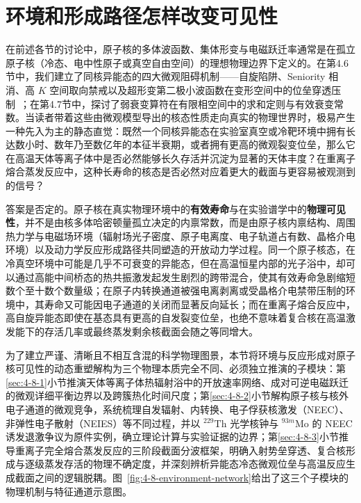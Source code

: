 \section{环境和形成路径怎样改变可见性}\label{sec:4-8}

在前述各节的讨论中，原子核的多体波函数、集体形变与电磁跃迁率通常是在孤立原子核（冷态、电中性原子或真空自由空间）的理想物理边界下定义的。在第4.6节中，我们建立了同核异能态的四大微观阻碍机制——自旋陷阱、Seniority 相消、高 $K$ 空间取向禁戒以及超形变第二极小波函数在变形空间中的位垒穿透压制~\cite{book-jain-nuclear-isomers}；在第4.7节中，探讨了弱衰变算符在有限相空间中的求和定则与有效衰变常数。当读者带着这些由微观模型导出的核态性质走向真实的物理世界时，极易产生一种先入为主的静态直觉：既然一个同核异能态在实验室真空或冷靶环境中拥有长达数小时、数年乃至数亿年的本征半衰期，或者拥有更高的微观裂变位垒，那么它在高温天体等离子体中是否必然能够长久存活并沉淀为显著的天体丰度？在重离子熔合蒸发反应中，这种长寿命的核态是否必然对应着更大的截面与更容易被观测到的信号？

答案是否定的。原子核在真实物理环境中的\textbf{有效寿命}与在实验谱学中的\textbf{物理可见性}，并不是由核多体哈密顿量孤立决定的内禀常数，而是由原子核内禀结构、周围热力学与电磁场环境（辐射场光子密度、原子电离度、电子轨道占有数、晶格介电环境）以及动力学反应形成路径共同塑造的开放动力学过程。同一个原子核态，在冷真空环境中可能是几乎不可衰变的异能态，但在高温恒星内部的光子浴中，却可以通过高能中间桥态的热共振激发起发生剧烈的跨带混合，使其有效寿命急剧缩短数个至十数个数量级；在原子内转换通道被强电离剥离或受晶格介电禁带压制的环境中，其寿命又可能因电子通道的关闭而显著反向延长；而在重离子熔合反应中，高自旋异能态即使在基态具有更高的自发裂变位垒，也绝不意味着复合核在高温激发能下的存活几率或最终蒸发剩余核截面会随之等同增大。

为了建立严谨、清晰且不相互含混的科学物理图景，本节将环境与反应形成对原子核可见性的动态重塑解构为三个物理本质完全不同、必须独立推演的子模块：第\ref{sec:4-8-1}小节推演天体等离子体热辐射浴中的开放速率网络、成对可逆电磁跃迁的微观详细平衡边界以及跨簇热化时间尺度；第\ref{sec:4-8-2}小节解构原子核与核外电子通道的微观竞争，系统梳理自发辐射、内转换、电子俘获核激发（NEEC）、非弹性电子散射（NEIES）等不同过程，并以 $^{229}\mathrm{Th}$ 光学核钟与 $^{93m}\mathrm{Mo}$ 的 NEEC 诱发退激争议为原件实例，确立理论计算与实验证据的边界；第\ref{sec:4-8-3}小节推导重离子完全熔合蒸发反应的三阶段截面分波框架，明确入射势垒穿透、复合核形成与逐级蒸发存活的物理不确定度，并深刻辨析异能态冷态微观位垒与高温反应生成截面之间的逻辑脱耦。图~\ref{fig:4-8-environment-network}给出了这三个子模块的物理机制与特征通道示意图。

